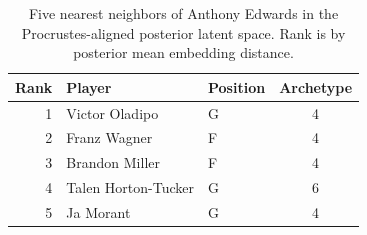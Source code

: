 \begin{table}[htbp]
  \centering\small
  \begin{tabular}{rllc}
    \toprule
    Rank & Player & Position & Archetype \\
    \midrule
    1 & Victor Oladipo & G & 4 \\
    2 & Franz Wagner & F & 4 \\
    3 & Brandon Miller & F & 4 \\
    4 & Talen Horton-Tucker & G & 6 \\
    5 & Ja Morant & G & 4 \\
    \bottomrule
  \end{tabular}
  \caption{Five nearest neighbors of Anthony Edwards in the Procrustes-aligned posterior latent space. Rank is by posterior mean embedding distance.}
  \label{tab:Anthony_Edwards_neighbors}
\end{table}

